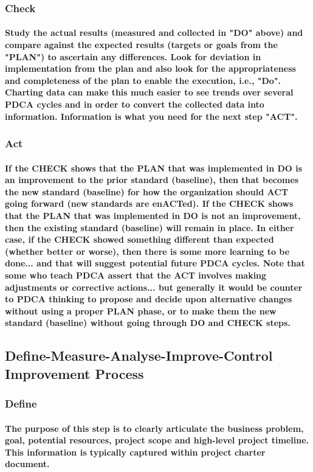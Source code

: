\documentclass{acm_proc_article-sp}
\begin{document}
\subsubsection{Check}
\paragraph{Study the actual results (measured and collected in "DO" above) and compare against the expected results (targets or goals from the "PLAN") to ascertain any differences. Look for deviation in implementation from the plan and also look for the appropriateness and completeness of the plan to enable the execution, i.e., "Do". Charting data can make this much easier to see trends over several PDCA cycles and in order to convert the collected data into information. Information is what you need for the next step "ACT".}
\subsubsection{Act}
\paragraph{If the CHECK shows that the PLAN that was implemented in DO is an improvement to the prior standard (baseline), then that becomes the new standard (baseline) for how the organization should ACT going forward (new standards are enACTed). If the CHECK shows that the PLAN that was implemented in DO is not an improvement, then the existing standard (baseline) will remain in place. In either case, if the CHECK showed something different than expected (whether better or worse), then there is some more learning to be done... and that will suggest potential future PDCA cycles. Note that some who teach PDCA assert that the ACT involves making adjustments or corrective actions... but generally it would be counter to PDCA thinking to propose and decide upon alternative changes without using a proper PLAN phase, or to make them the new standard (baseline) without going through DO and CHECK steps.}
\subsection{Define-Measure-Analyse-Improve-Control Improvement Process}
\subsubsection{Define}
\paragraph{The purpose of this step is to clearly articulate the business problem, goal, potential resources, project scope and high-level project timeline. This information is typically captured within project charter document.}
\end{document}
